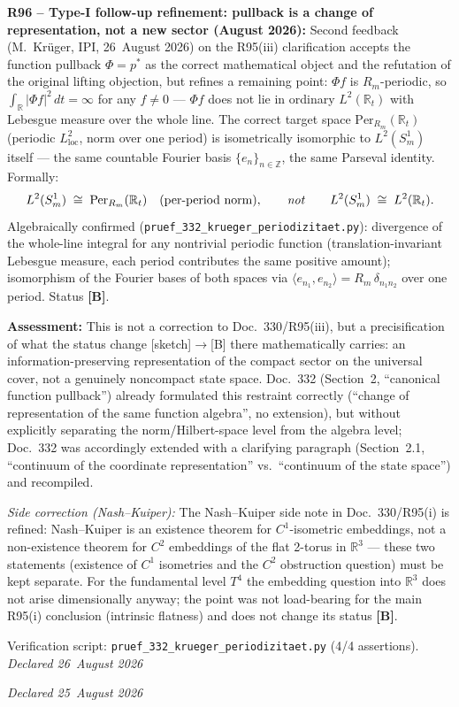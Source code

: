 \medskip

\textbf{R96 -- Type-I follow-up refinement: pullback is a change of representation, not a new sector (August 2026):}
Second feedback (M.~Krüger, IPI, 26~August 2026) on the R95(iii)
clarification accepts the function pullback $\Phi=p^*$ as the correct
mathematical object and the refutation of the original lifting
objection, but refines a remaining point: $\Phi f$ is $R_m$-periodic,
so $\int_{\mathbb{R}} |\Phi f|^2\,dt = \infty$ for any $f\neq0$ ---
$\Phi f$ does not lie in ordinary $L^2(\mathbb{R}_t)$ with Lebesgue
measure over the whole line. The correct target space
$\mathrm{Per}_{R_m}(\mathbb{R}_t)$ (periodic $L^2_\mathrm{loc}$, norm
over one period) is isometrically isomorphic to $L^2(S^1_m)$ itself ---
the same countable Fourier basis $\{e_n\}_{n\in\mathbb{Z}}$, the same
Parseval identity. Formally:
\[
L^2(S^1_m) \;\cong\; \mathrm{Per}_{R_m}(\mathbb{R}_t)
\quad\text{(per-period norm)},
\qquad\text{\emph{not}}\qquad
L^2(S^1_m) \;\cong\; L^2(\mathbb{R}_t).
\]
Algebraically confirmed (\texttt{pruef\_332\_krueger\_periodizitaet.py}):
divergence of the whole-line integral for any nontrivial periodic
function (translation-invariant Lebesgue measure, each period
contributes the same positive amount); isomorphism of the Fourier bases
of both spaces via $\langle e_{n_1},e_{n_2}\rangle=R_m\,\delta_{n_1 n_2}$
over one period. Status \textbf{[B]}.

\textbf{Assessment:} This is not a correction to Doc.~330/R95(iii), but
a precisification of what the status change [sketch]$\to$[B] there
mathematically carries: an information-preserving representation of the
compact sector on the universal cover, not a genuinely noncompact state
space. Doc.~332 (Section~2, ``canonical function pullback'') already
formulated this restraint correctly (``change of representation of the
same function algebra'', no extension), but without explicitly
separating the norm/Hilbert-space level from the algebra level; Doc.~332
was accordingly extended with a clarifying paragraph (Section~2.1,
``continuum of the coordinate representation'' vs.\ ``continuum of the
state space'') and recompiled.

\emph{Side correction (Nash--Kuiper):} The Nash--Kuiper side note in
Doc.~330/R95(i) is refined: Nash--Kuiper is an existence theorem for
$C^1$-isometric embeddings, not a non-existence theorem for $C^2$
embeddings of the flat 2-torus in $\mathbb{R}^3$ --- these two statements
(existence of $C^1$ isometries and the $C^2$ obstruction question) must
be kept separate. For the fundamental level $T^4$ the embedding question
into $\mathbb{R}^3$ does not arise dimensionally anyway; the point was
not load-bearing for the main R95(i) conclusion (intrinsic flatness) and
does not change its status \textbf{[B]}.

Verification script: \texttt{pruef\_332\_krueger\_periodizitaet.py} (4/4 assertions).\\
\emph{Declared 26~August 2026}

\medskip
\emph{Declared 25~August 2026}

\medskip
